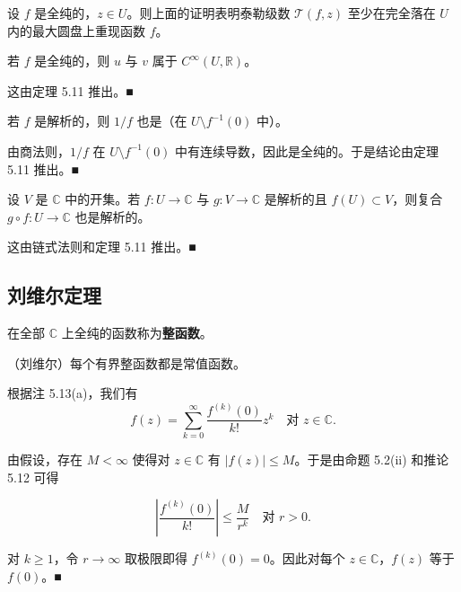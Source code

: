 \begin{remark}

\begin{items}
\item

设 $ f $ 是全纯的，$ z \in U $。则上面的证明表明泰勒级数 $ \mathcal{T}(f,z) $ 至少在完全落在 $ U $ 内的最大圆盘上重现函数 $ f $。

\item

若 $ f $ 是全纯的，则 $ u $ 与 $ v $ 属于 $ C^{\infty}(U,\mathbb{R}) $。

\proofhead
这由定理 5.11 推出。\nobreak\hspace{0.35em}■
\item

若 $ f $ 是解析的，则 $ 1/f $ 也是（在 $ U\setminus f^{-1}(0) $ 中）。

\proofhead
由商法则，$ 1/f $ 在 $ U\setminus f^{-1}(0) $ 中有连续导数，因此是全纯的。于是结论由定理 5.11 推出。\nobreak\hspace{0.35em}■
\item

设 $ V $ 是 $ \mathbb{C} $ 中的开集。若 $ f : U \to \mathbb{C} $ 与 $ g : V \to \mathbb{C} $ 是解析的且 $ f(U) \subset V $，则复合 $ g \circ f : U \to \mathbb{C} $ 也是解析的。

\proofhead
这由链式法则和定理 5.11 推出。\nobreak\hspace{0.35em}■
\end{items}

\end{remark}

\subsection*{刘维尔定理}

在全部 $ \mathbb{C} $ 上全纯的函数称为\textbf{整函数}。

\begin{theorem}

（刘维尔）每个有界整函数都是常值函数。

\proofhead
根据注 5.13(a)，我们有
\[
f(z) = \sum_{k=0}^{\infty}\frac{f^{(k)}(0)}{k!}z^{k} \quad \text{对 } z \in \mathbb{C} .
\]

由假设，存在 $ M < \infty $ 使得对 $ z \in \mathbb{C} $ 有 $ |f(z)| \le M $。于是由命题 5.2(ii) 和推论 5.12 可得

\[
\left|\frac{f^{(k)}(0)}{k!}\right| \le \frac{M}{r^{k}} \quad \text{对 } r > 0 .
\]

对 $ k \ge 1 $，令 $ r \to \infty $ 取极限即得 $ f^{(k)}(0) = 0 $。因此对每个 $ z \in \mathbb{C} $，$ f(z) $ 等于 $ f(0) $。\nobreak\hspace{0.35em}■

\end{theorem}

